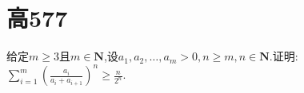 \documentclass[question]{article}
\title{}
\author{}
\date{}
\begin{document}
\maketitle
\section{高577}{
给定$m\geq 3$且$m \in \mathbf{N}$,设$a_1,a_2,…,a_m >0, n\geq m ,n \in \mathbf{N}$.证明:\\
$\displaystyle \sum\limits_{i=1}^m{(\frac{a_i}{a_i+a_{i+1}})^n}\geq \frac{n}{2^n}$.
}
\end{document}
